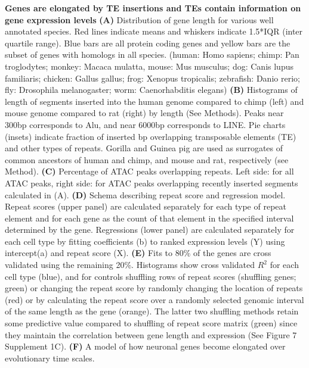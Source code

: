 \textbf{Genes are elongated by TE insertions and TEs contain information on gene expression levels}
\textbf{(A)} Distribution of gene length for various well annotated species. Red lines indicate means and whiskers indicate 1.5*IQR (inter quartile range). Blue bars are all protein coding genes and yellow bars are the subset of genes with homologs in all species. (human: Homo sapiens; chimp: Pan troglodytes; monkey: Macaca mulatta, mouse: Mus musculus; dog: Canis lupus familiaris; chicken: Gallus gallus; frog: Xenopus tropicalis; zebrafish: Danio rerio; fly: Drosophila melanogaster; worm: Caenorhabditis  elegans)
\textbf{(B)} Histograms of length of segments inserted into the human genome compared to chimp (left) and mouse genome compared to rat (right) by length (See Methods). Peaks near 300bp corresponds to Alu, and near 6000bp corresponds to LINE. Pie charts (insets) indicate fraction of inserted bp overlapping transposable elements (TE) and other types of repeats. Gorilla and Guinea pig are used as surrogates of common ancestors of human and chimp, and mouse and rat, respectively (see Method). 
\textbf{(C)} Percentage of ATAC peaks overlapping repeats. Left side: for all ATAC peaks, right side: for ATAC peaks overlapping recently inserted segments calculated in (A). 
\textbf{(D)} Schema describing repeat score and regression model. Repeat scores (upper panel) are calculated separately for each type of repeat element and for each gene as the count of that element in the specified interval determined by the gene. Regressions (lower panel) are calculated separately for each cell type by fitting coefficients (b) to ranked expression levels (Y) using intercept(a) and repeat score (X). 
\textbf{(E)} Fits to 80\% of the genes are cross validated using the remaining 20\%. Histograms show cross validated $R^2$ for each cell type (blue), and for controls shuffling rows of repeat scores (shuffling genes; green) or changing the repeat score by randomly changing the location of repeats (red) or by calculating the repeat score over a randomly selected genomic interval of the same length as the gene (orange). The latter two shuffling methods retain some predictive value compared to shuffling of repeat score matrix (green) since they maintain the correlation between gene length and expression (See Figure 7 Supplement 1C).
\textbf{(F)} A model of how neuronal genes become elongated over evolutionary time scales. 
